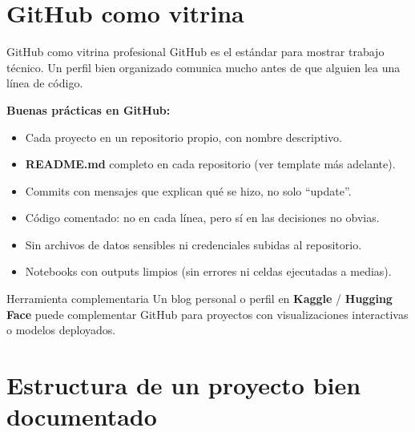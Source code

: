 \documentclass[aspectratio=169]{beamer}
\begin{document}
\section{GitHub como vitrina}

\begin{frame}{GitHub como vitrina profesional}
  GitHub es el estándar para mostrar trabajo técnico. Un perfil bien organizado comunica mucho antes de que alguien lea una línea de código.

  \bigskip
  \textbf{Buenas prácticas en GitHub:}
  \begin{itemize}
    \item Cada proyecto en un repositorio propio, con nombre descriptivo.
    \item \textbf{README.md} completo en cada repositorio (ver template más adelante).
    \item Commits con mensajes que explican qué se hizo, no solo ``update''.
    \item Código comentado: no en cada línea, pero sí en las decisiones no obvias.
    \item Sin archivos de datos sensibles ni credenciales subidas al repositorio.
    \item Notebooks con outputs limpios (sin errores ni celdas ejecutadas a medias).
  \end{itemize}

  \bigskip
  \begin{exampleblock}{Herramienta complementaria}
    Un blog personal o perfil en \textbf{Kaggle} / \textbf{Hugging Face} puede complementar GitHub para proyectos con visualizaciones interactivas o modelos deployados.
  \end{exampleblock}
\end{frame}

\section{Estructura de un proyecto bien documentado}
\end{document}
